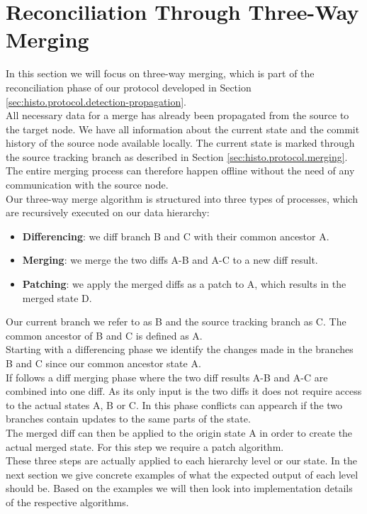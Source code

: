 
\section{Reconciliation Through Three-Way Merging}
\label{sec:histo.merging}
In this section we will focus on three-way merging, which is part of the reconciliation phase of our protocol developed in Section \ref{sec:histo.protocol.detection-propagation}.\\
All necessary data for a merge has already been propagated from the source to the target node.
We have all information about the current state and the commit history of the source node available locally.
The current state is marked through the source tracking branch as described in Section \ref{sec:histo.protocol.merging}.
The entire merging process can therefore happen offline without the need of any communication with the source node.\\
Our three-way merge algorithm is structured into three types of processes, which are recursively executed on our data hierarchy:

\begin{itemize}
\item \textbf{Differencing}: we diff branch B and C with their common ancestor A.
\item \textbf{Merging}: we merge the two diffs A-B and A-C to a new diff result.
\item \textbf{Patching}: we apply the merged diffs as a patch to A, which results in the merged state D.
\end{itemize}

Our current branch we refer to as B and the source tracking branch as C.
The common ancestor of B and C is defined as A.\\
Starting with a differencing phase we identify the changes made in the branches B and C since our common ancestor state A.\\
If follows a diff merging phase where the two diff results A-B and A-C are combined into one diff.
As its only input is the two diffs it does not require access to the actual states A, B or C.
In this phase conflicts can appearch if the two branches contain updates to the same parts of the state.\\
The merged diff can then be applied to the origin state A in order to create the actual merged state.
For this step we require a patch algorithm.\\
These three steps are actually applied to each hierarchy level or our state.
In the next section we give concrete examples of what the expected output of each level should be.
Based on the examples we will then look into implementation details of the respective algorithms.

